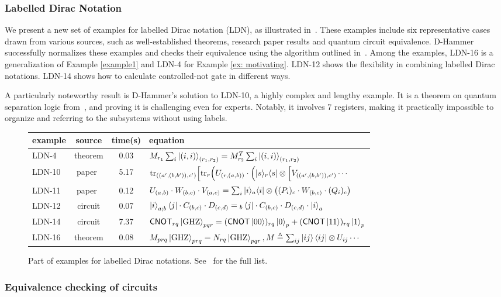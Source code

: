 \subsubsection{Labelled Dirac Notation}
We present a new set of examples for labelled Dirac notation (LDN), as illustrated in~. These examples include six representative cases drawn from various sources, such as well-established theorems, research paper results and quantum circuit equivalence.
D-Hammer successfully normalizes these examples and checks their equivalence using the algorithm outlined in~.
Among the examples, LDN-16 is a generalization of Example \ref{example1} and LDN-4 for Example \ref{ex: motivating}. LDN-12 shows the flexibility in combining labelled Dirac notations.
LDN-14 shows how to calculate controlled-not gate in different ways. 

A particularly noteworthy result is D-Hammer's solution to LDN-10, a highly complex and lengthy example. It is a theorem on quantum separation logic from~\cite{DBLP:conf/lics/ZhouBHYY21}, and proving it is challenging even for experts. Notably, it involves 7 registers, making it practically impossible to organize and referring to the subsystems without using labels.

\begin{figure}[h]
    \center
    \setlength{\extrarowheight}{2pt}
    \begin{tabular}{l c c l}
        \hline
        example & source & time(s) & equation \\
        \hline
        LDN-4 & theorem & 0.03 & \( M_{r_1}\sum_{i}\ket{(i,i)}_{(r_1,r_2)} = M^T_{r_2}\sum_{i}\ket{(i,i)}_{(r_1, r_2)} \)\\
        LDN-10 & paper~\cite{DBLP:conf/lics/ZhouBHYY21} & 5.17 & \( \mathrm{tr}_{((a',(b,b')),c')}\Big[\mathrm{tr}_{r}\Big(U_{(r,(a,b))} \cdot\Big(|s\rangle_r\langle s|\otimes 
        \Big[V_{((a',(b,b')),c')} \cdots \)\\
        LDN-11 & paper~\cite{PALSBERG2024206} & 0.12 & \( U_{(a,b)}\cdot W_{(b,c)}\cdot V_{(a,c)} = 
        \sum_i |i\rangle_a\langle i|\otimes \big((P_i)_c\cdot W_{(b,c)}\cdot (Q_i)_c\big)\) \\
        LDN-12 & circuit & 0.07 & \( \ket{i}_{a;b}\bra{j} \cdot C_{(b,c)} \cdot D_{(c,d)} = {}_b\bra{j} \cdot C_{(b,c)} \cdot D_{(c,d)} \cdot \ket{i}_{a}\) \\
        LDN-14 & circuit & 7.37 & \scriptsize{\( \textsf{CNOT}_{rq}\ket{\textrm{GHZ}}_{pqr} = (\textsf{CNOT}\ket{00})_{rq}\ket{0}_p + (\textsf{CNOT}\ket{11})_{rq}\ket{1}_p \)} \\
        LDN-16 & theorem & 0.08 & \scriptsize{\( M_{prq}\ket{\textrm{GHZ}}_{prq} = N_{rq} \ket{\textrm{GHZ}}_{pqr}, M \triangleq \sum_{ij}\ket{ij}\bra{ij}\otimes U_{ij} \cdots \)} \\
        \hline
    \end{tabular}
    \caption{Part of examples for labelled Dirac notations. See~ for the full list.}
    \vspace{-0.2cm}
    \label{fig: labelled examples}
\end{figure}

\subsubsection*{Equivalence checking of circuits}
